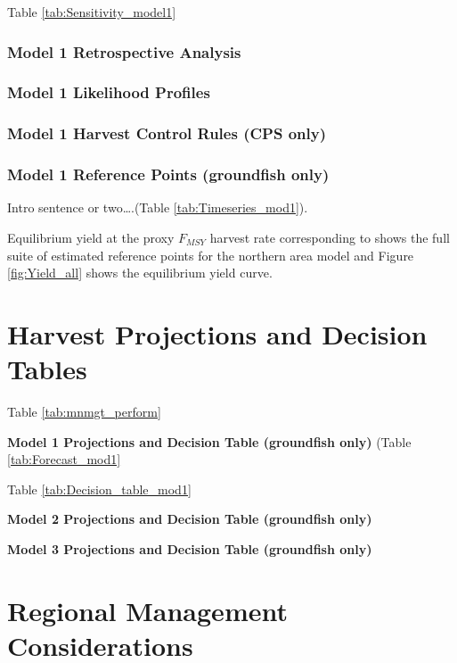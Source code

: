 \documentclass[12pt,]{article}
\begin{document}
Table \ref{tab:Sensitivity_model1}

\subsubsection{Model 1 Retrospective
Analysis}\label{model-1-retrospective-analysis}

\subsubsection{Model 1 Likelihood
Profiles}\label{model-1-likelihood-profiles}

\subsubsection{Model 1 Harvest Control Rules (CPS
only)}\label{model-1-harvest-control-rules-cps-only}

\subsubsection{Model 1 Reference Points (groundfish
only)}\label{model-1-reference-points-groundfish-only}

Intro sentence or two\ldots{}.(Table \ref{tab:Timeseries_mod1}).

Equilibrium yield at the proxy \(F_{MSY}\) harvest rate corresponding to
shows the full suite of estimated reference points for the northern area
model and Figure \ref{fig:Yield_all} shows the equilibrium yield curve.

\section{Harvest Projections and Decision
Tables}\label{harvest-projections-and-decision-tables}

Table \ref{tab:mnmgt_perform}

\textbf{Model 1 Projections and Decision Table (groundfish only)} (Table
\ref{tab:Forecast_mod1}

Table \ref{tab:Decision_table_mod1}

\textbf{Model 2 Projections and Decision Table (groundfish only)}

\textbf{Model 3 Projections and Decision Table (groundfish only)}

\section{Regional Management
Considerations}\label{regional-management-considerations}
\end{document}
